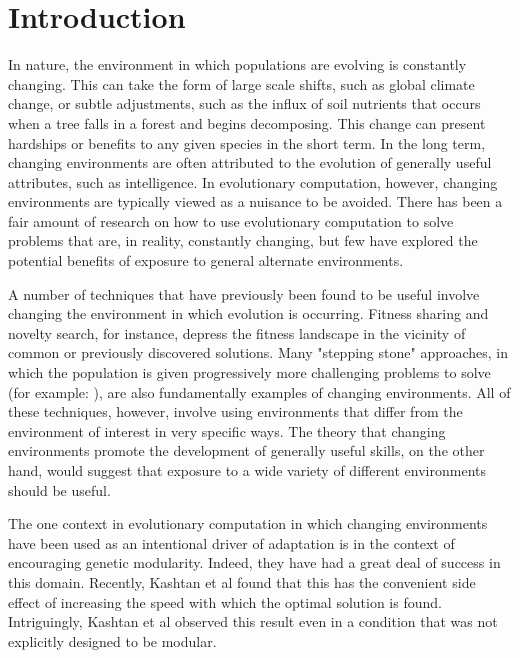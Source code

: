 \documentclass{sig-alternate}
\begin{document}
\section{Introduction}
In nature, the environment in which populations are evolving is constantly changing. This can take the form of large scale shifts, such as global climate change, or subtle adjustments, such as the influx of soil nutrients that occurs when a tree falls in a forest and begins decomposing. This change can present hardships or benefits to any given species in the short term. In the long term, changing environments are often attributed to the evolution of generally useful attributes, such as intelligence\cite{parter_facilitated_2008}. In evolutionary computation, however, changing environments are typically viewed as a nuisance to be avoided. There has been a fair amount of research on how to use evolutionary computation to solve problems that are, in reality, constantly changing, but few have explored the potential benefits of exposure to general alternate environments.

A number of techniques that have previously been found to be useful involve changing the environment in which evolution is occurring. Fitness sharing\cite{goldberg_genetic_1987} and novelty search\cite{lehman_abandoning_2011}, for instance, depress the fitness landscape in the vicinity of common or previously discovered solutions. Many "stepping stone" approaches, in which the population is given progressively more challenging problems to solve (for example: \cite{harper_spatial_2012}), are also fundamentally examples of changing environments. All of these techniques, however, involve using environments that differ from the environment of interest in very specific ways. The theory that changing environments promote the development of generally useful skills, on the other hand, would suggest that exposure to a wide variety of different environments should be useful.

The one context in evolutionary computation in which changing environments have been used as an intentional driver of adaptation is in the context of encouraging genetic modularity. Indeed, they have had a great deal of success in this domain\cite{ovaska_periodical_2009}\cite{intelligent_systems_group_department_of_computer_science_university_of_bath_bath_ba1_7ay_u.k._evolving_2014}.  Recently, Kashtan et al found that this has the convenient side effect of increasing the speed with which the optimal solution is found\cite{kashtan_varying_2007}. Intriguingly, Kashtan et al observed this result even in a condition that was not explicitly designed to be modular.
\end{document}
